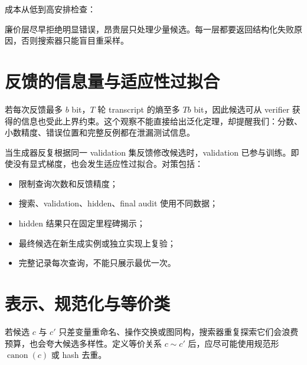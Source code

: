 成本从低到高安排检查：
\begin{center}
\end{center}
廉价层尽早拒绝明显错误，昂贵层只处理少量候选。每一层都要返回结构化失败原因，否则搜索器只能盲目重采样。

\section{反馈的信息量与适应性过拟合}

若每次反馈最多 $b$ bit，$T$ 轮 transcript 的熵至多 $Tb$ bit，因此候选可从 verifier 获得的信息也受此上界约束。这个观察不能直接给出泛化定理，却提醒我们：分数、小数精度、错误位置和完整反例都在泄漏测试信息。

当生成器反复根据同一 validation 集反馈修改候选时，validation 已参与训练。即使没有显式梯度，也会发生适应性过拟合。对策包括：
\begin{itemize}
  \item 限制查询次数和反馈精度；
  \item 搜索、validation、hidden、final audit 使用不同数据；
  \item hidden 结果只在固定里程碑揭示；
  \item 最终候选在新生成实例或独立实现上复验；
  \item 完整记录每次查询，不能只展示最优一次。
\end{itemize}

\section{表示、规范化与等价类}

若候选 $c$ 与 $c'$ 只差变量重命名、操作交换或图同构，搜索器重复探索它们会浪费预算，也会夸大候选多样性。定义等价关系 $c\sim c'$ 后，应尽可能使用规范形 $\operatorname{canon}(c)$ 或 hash 去重。

